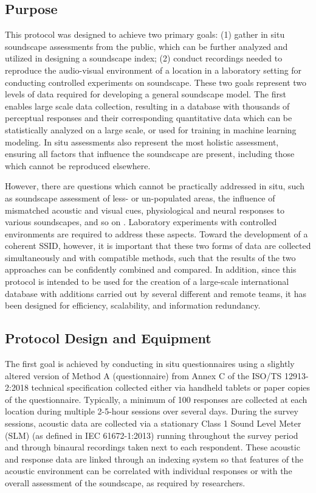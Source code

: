  \subsection{Purpose}
   This protocol was designed to achieve two primary goals: (1) gather in situ soundscape assessments from the public, which can be further analyzed and utilized in designing a soundscape index; (2) conduct recordings needed to reproduce the audio-visual environment of a location in a laboratory setting for conducting controlled experiments on soundscape. These two goals represent two levels of data required for developing a general soundscape model. The first enables large scale data collection, resulting in a database with thousands of perceptual responses and their corresponding quantitative data which can be statistically analyzed on a large scale, or used for training in machine learning modeling. In situ assessments also represent the most holistic assessment, ensuring all factors that influence the soundscape are present, including those which cannot be reproduced elsewhere.

   However, there are questions which cannot be practically addressed in situ, such as soundscape assessment of less- or un-populated areas, the influence of mismatched acoustic and visual cues, physiological and neural responses to various soundscapes, and so on \citep{Kogan2017comprehensive}. Laboratory experiments with controlled environments are required to address these aspects. Toward the development of a coherent SSID, however, it is important that these two forms of data are collected simultaneously and with compatible methods, such that the results of the two approaches can be confidently combined and compared. In addition, since this protocol is intended to be used for the creation of a large-scale international database with additions carried out by several different and remote teams, it has been designed for efficiency, scalability, and information redundancy.

 \subsection{Protocol Design and Equipment}
   \label{section:design}
   The first goal is achieved by conducting in situ questionnaires using a slightly altered version of Method A (questionnaire) from Annex C of the ISO/TS 12913-2:2018 technical specification \citep{ISO12913_2_2018IOS} collected either via handheld tablets or paper copies of the questionnaire. Typically, a minimum of 100 responses are collected at each location during multiple 2-5-hour sessions over several days. During the survey sessions, acoustic data are collected via a stationary Class 1 Sound Level Meter (SLM) (as defined in IEC 61672-1:2013) running throughout the survey period and through binaural recordings taken next to each respondent. %
   These acoustic and response data are linked through an indexing system so that features of the acoustic environment can be correlated with individual responses or with the overall assessment of the soundscape, as required by researchers.

